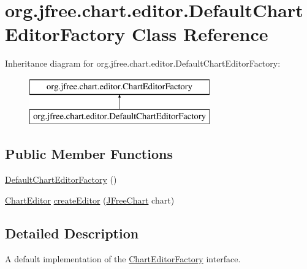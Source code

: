 \hypertarget{classorg_1_1jfree_1_1chart_1_1editor_1_1_default_chart_editor_factory}{}\section{org.\+jfree.\+chart.\+editor.\+Default\+Chart\+Editor\+Factory Class Reference}
\label{classorg_1_1jfree_1_1chart_1_1editor_1_1_default_chart_editor_factory}
Inheritance diagram for org.\+jfree.\+chart.\+editor.\+Default\+Chart\+Editor\+Factory\+:\begin{figure}[H]
\begin{center}
\leavevmode
\includegraphics[height=2.000000cm]{classorg_1_1jfree_1_1chart_1_1editor_1_1_default_chart_editor_factory}
\end{center}
\end{figure}
\subsection*{Public Member Functions}
\begin{DoxyCompactItemize}
\item 
\mbox{\hyperlink{classorg_1_1jfree_1_1chart_1_1editor_1_1_default_chart_editor_factory_a101b68881eb5d22f62522ddc28a65333}{Default\+Chart\+Editor\+Factory}} ()
\item 
\mbox{\hyperlink{interfaceorg_1_1jfree_1_1chart_1_1editor_1_1_chart_editor}{Chart\+Editor}} \mbox{\hyperlink{classorg_1_1jfree_1_1chart_1_1editor_1_1_default_chart_editor_factory_a60da8d3019f6cd965af30841d66689c4}{create\+Editor}} (\mbox{\hyperlink{classorg_1_1jfree_1_1chart_1_1_j_free_chart}{J\+Free\+Chart}} chart)
\end{DoxyCompactItemize}


\subsection{Detailed Description}
A default implementation of the \mbox{\hyperlink{interfaceorg_1_1jfree_1_1chart_1_1editor_1_1_chart_editor_factory}{Chart\+Editor\+Factory}} interface. 

